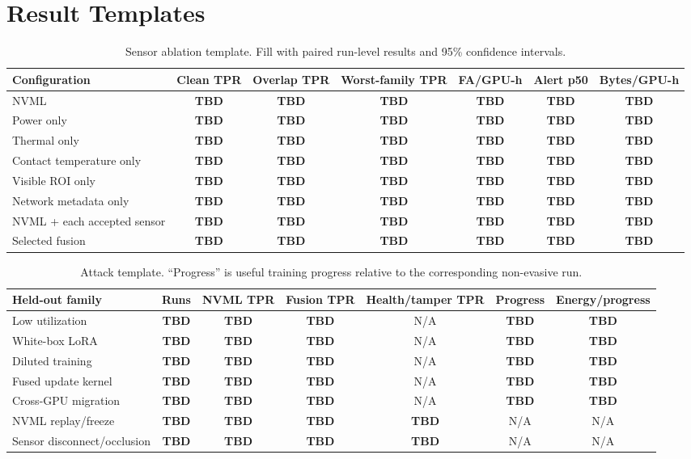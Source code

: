 \documentclass[sigplan,anonymous,review,nonacm]{acmart}
\newcommand{\tbd}{\textcolor{planred}{\textbf{TBD}}}
\begin{document}
\section{Result Templates}

\begin{table}[H]
\centering
\caption{Sensor ablation template. Fill with paired run-level results and 95\% confidence intervals.}
\small
\begin{tabular}{lcccccc}
\toprule
Configuration & Clean TPR & Overlap TPR & Worst-family TPR & FA/GPU-h & Alert p50 & Bytes/GPU-h \\
\midrule
NVML & \tbd & \tbd & \tbd & \tbd & \tbd & \tbd \\
Power only & \tbd & \tbd & \tbd & \tbd & \tbd & \tbd \\
Thermal only & \tbd & \tbd & \tbd & \tbd & \tbd & \tbd \\
Contact temperature only & \tbd & \tbd & \tbd & \tbd & \tbd & \tbd \\
Visible ROI only & \tbd & \tbd & \tbd & \tbd & \tbd & \tbd \\
Network metadata only & \tbd & \tbd & \tbd & \tbd & \tbd & \tbd \\
NVML + each accepted sensor & \tbd & \tbd & \tbd & \tbd & \tbd & \tbd \\
Selected fusion & \tbd & \tbd & \tbd & \tbd & \tbd & \tbd \\
\bottomrule
\end{tabular}
\end{table}

\begin{table}[H]
\centering
\caption{Attack template. ``Progress'' is useful training progress relative to the corresponding non-evasive run.}
\small
\begin{tabular}{lcccccc}
\toprule
Held-out family & Runs & NVML TPR & Fusion TPR & Health/tamper TPR & Progress & Energy/progress \\
\midrule
Low utilization & \tbd & \tbd & \tbd & N/A & \tbd & \tbd \\
White-box LoRA & \tbd & \tbd & \tbd & N/A & \tbd & \tbd \\
Diluted training & \tbd & \tbd & \tbd & N/A & \tbd & \tbd \\
Fused update kernel & \tbd & \tbd & \tbd & N/A & \tbd & \tbd \\
Cross-GPU migration & \tbd & \tbd & \tbd & N/A & \tbd & \tbd \\
NVML replay/freeze & \tbd & \tbd & \tbd & \tbd & N/A & N/A \\
Sensor disconnect/occlusion & \tbd & \tbd & \tbd & \tbd & N/A & N/A \\
\bottomrule
\end{tabular}
\end{table}
\end{document}
